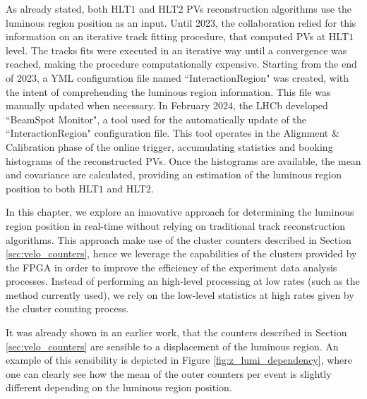As already stated, both HLT$1$ and HLT$2$ PVs reconstruction algorithms use the luminous region position as an input. Until 2023, the collaboration relied for this information on an iterative track fitting procedure, that computed PVs at HLT$1$ level. The tracks fits were executed in an iterative way until a convergence was reached, making the procedure computationally expensive. Starting from the end of 2023, a YML configuration file named ``InteractionRegion" was created, with the intent of comprehending the luminous region information. This file was manually updated when necessary. In February 2024, the LHCb developed ``BeamSpot Monitor", a tool used for the automatically update of the ``InteractionRegion" configuration file.  This tool operates in the Alignment \& Calibration phase of the online trigger, accumulating statistics and booking histograms of the reconstructed PVs. Once the histograms are available, the mean and covariance are calculated, providing an estimation of the luminous region position to both HLT$1$ and HLT$2$. 

In this chapter, we explore an innovative approach for determining the luminous region position in real-time without relying on traditional track reconstruction algorithms. This approach make use of the cluster counters described in Section \ref{sec:velo_counters}, hence we leverage the capabilities of the clusters provided by the FPGA in order to improve the efficiency of the experiment data analysis processes. Instead of performing an high-level processing at low rates (such as the method currently used), we rely on the low-level statistics at high rates given by the cluster counting process.

It was already shown in an earlier work\cite{dan}, that the counters described in Section \ref{sec:velo_counters} are sensible to a displacement of the luminous region. An example of this sensibility is depicted in Figure \ref{fig:z_lumi_dependency}, where one can clearly see how the mean of the outer counters per event is slightly different depending on the luminous region position. 

